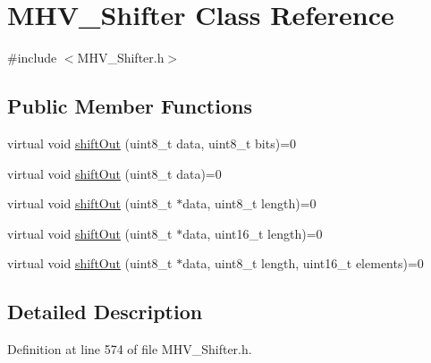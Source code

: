 \hypertarget{class_m_h_v___shifter}{
\section{\-M\-H\-V\-\_\-\-Shifter \-Class \-Reference}
\label{class_m_h_v___shifter}
}


{\ttfamily \#include $<$\-M\-H\-V\-\_\-\-Shifter.\-h$>$}

\subsection*{\-Public \-Member \-Functions}
\begin{DoxyCompactItemize}
\item 
virtual void \hyperlink{class_m_h_v___shifter_a4e0972d0c8471a4f53ba8e683a8436f7}{shift\-Out} (uint8\-\_\-t data, uint8\-\_\-t bits)=0
\item 
virtual void \hyperlink{class_m_h_v___shifter_a6c1cc1bc7adb72bfcc7482e1731898d4}{shift\-Out} (uint8\-\_\-t data)=0
\item 
virtual void \hyperlink{class_m_h_v___shifter_a51636cdb41c763615ec27800275ae4dd}{shift\-Out} (uint8\-\_\-t $\ast$data, uint8\-\_\-t length)=0
\item 
virtual void \hyperlink{class_m_h_v___shifter_a9ee15658e944ba4258121c59a71c30e5}{shift\-Out} (uint8\-\_\-t $\ast$data, uint16\-\_\-t length)=0
\item 
virtual void \hyperlink{class_m_h_v___shifter_aa923b774e68afb5ec9d58a4eac30ab34}{shift\-Out} (uint8\-\_\-t $\ast$data, uint8\-\_\-t length, uint16\-\_\-t elements)=0
\end{DoxyCompactItemize}


\subsection{\-Detailed \-Description}


\-Definition at line 574 of file \-M\-H\-V\-\_\-\-Shifter.\-h.



